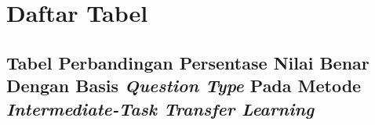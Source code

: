 \chapter*{Daftar Tabel}
\label{Lampiran Terkait Tabel: 7.3}

\section*{Tabel Perbandingan Persentase Nilai Benar Dengan Basis \emph{Question Type} Pada Metode \emph{Intermediate-Task Transfer Learning}}

